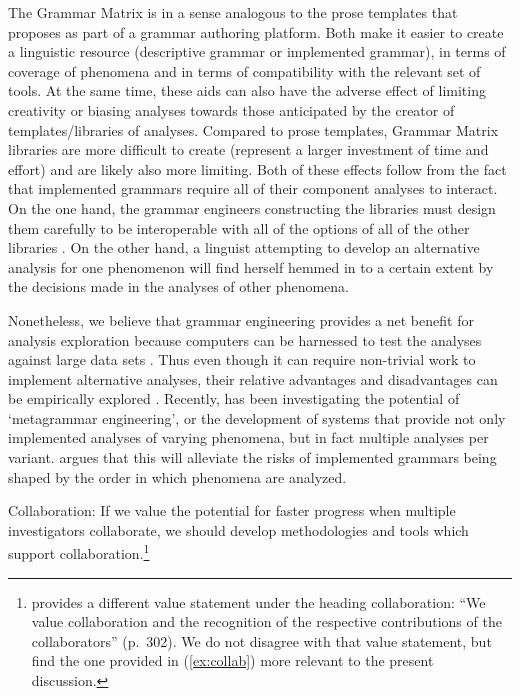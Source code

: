 The Grammar Matrix is in a sense analogous to the prose templates
that \citeauthor{Nordhoff:08} proposes as part of a grammar authoring
platform.  Both make it easier to create a linguistic resource
(descriptive grammar or implemented grammar), in terms of coverage
of phenomena and in terms of compatibility with the relevant set of
tools.  At the same time, these aids can also have the adverse effect
of limiting creativity or biasing analyses towards those anticipated
by the creator of templates/libraries of analyses.  Compared to prose
templates, Grammar Matrix libraries are more difficult to create
(represent a larger investment of time and effort) and are likely also more limiting.  Both
of these effects follow from the fact that implemented grammars 
require all of their component analyses to interact.  On the one hand,
the grammar engineers constructing the libraries must design them
carefully to be interoperable with all of the options of all of
the other libraries \cite[Ch.\ 2]{Drellishak:09}.  On the other
hand, a linguist attempting to develop an alternative analysis for
one phenomenon will find herself hemmed in to a certain extent by
the decisions made in the analyses of other phenomena.

Nonetheless, we believe that grammar engineering provides a net
benefit for analysis exploration because computers can be harnessed to
test the analyses against large data sets
\citep{Bender:08,Ben:Fli:Oep:11}.  Thus even though it can require
non-trivial work to implement alternative analyses, their relative
advantages and disadvantages can be empirically explored
\citep{Bender:10}.  Recently,  has been investigating
the potential of `metagrammar engineering', or the development of
systems that provide not only implemented analyses of varying
phenomena, but in fact multiple analyses per variant.
\citeauthor{Fokkens:11} argues that this will alleviate the risks of
implemented grammars being shaped by the order in which phenomena are
analyzed.

\begin{exe}
\ex\label{ex:collab} {\sc Collaboration:} If we value the potential
for faster progress when multiple investigators collaborate, we should
develop methodologies and tools which support
collaboration.\footnote{\citeauthor{Nordhoff:08} provides a different
  value statement under the heading collaboration: ``We value
  collaboration and the recognition of the respective contributions of
  the collaborators'' (p.\ 302).  We do not disagree with that value
  statement, but find the one provided in (\ref{ex:collab}) more
  relevant to the present discussion.}
\end{exe}


